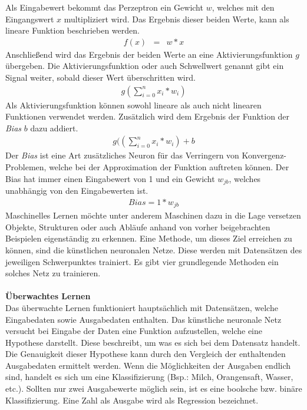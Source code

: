 Als Eingabewert bekommt das Perzeptron ein Gewicht $w$, welches mit den Eingangswert $x$ multipliziert wird. Das Ergebnis dieser beiden Werte, kann als lineare Funktion beschrieben werden.
\begin{eqnarray} f(x) & = & w*x \end{eqnarray}
Anschließend wird das Ergebnis der beiden Werte an eine Aktivierungsfunktion $g$ übergeben. Die Aktivierungsfunktion oder auch Schwellwert genannt gibt ein Signal weiter, sobald dieser Wert überschritten wird.
\begin{eqnarray} g( \sum_{i=0}^n x_{i} *w_{i}) \end{eqnarray}
Als Aktivierungsfunktion können sowohl lineare als auch nicht linearen Funktionen verwendet werden. Zusätzlich wird dem Ergebnis der Funktion der \textit{Bias} $b$ dazu addiert.
\begin{eqnarray} g(( \sum_{i=0}^n x_{i} *w_{i}) +b \end{eqnarray}
Der \textit{Bias} ist eine Art zusätzliches Neuron für das Verringern von Konvergenz-Problemen, welche bei der Approximation der Funktion auftreten können. Der Bias hat immer einen Eingabewert von 1 und ein Gewicht $w_{jb}$, welches unabhängig von den Eingabewerten ist.
\begin{eqnarray} Bias = 1*w_{jb} \end{eqnarray}
Maschinelles Lernen möchte unter anderem Maschinen dazu in die Lage versetzen Objekte, Strukturen oder auch Abläufe anhand von vorher beigebrachten Beispielen eigenständig zu erkennen. Eine Methode, um dieses Ziel erreichen zu können, sind die künstlichen neuronalen Netze. Diese werden mit Datensätzen des jeweiligen Schwerpunktes trainiert. Es gibt vier grundlegende Methoden ein solches Netz zu trainieren.\\\\
\textbf{Überwachtes Lernen}\\
Das überwachte Lernen funktioniert hauptsächlich mit Datensätzen, welche Eingabedaten sowie Ausgabedaten enthalten. Das künstliche neuronale Netz versucht bei Eingabe der Daten eine Funktion aufzustellen, welche eine Hypothese darstellt. Diese beschreibt, um was es sich bei dem Datensatz handelt. Die Genauigkeit dieser Hypothese kann durch den Vergleich der enthaltenden Ausgabedaten ermittelt werden. Wenn die Möglichkeiten der Ausgaben endlich sind, handelt es sich um eine Klassifizierung (Bsp.: Milch, Orangensaft, Wasser, etc.). Sollten nur zwei Ausgabewerte möglich sein, ist es eine boolsche bzw. binäre Klassifizierung. Eine Zahl als Ausgabe wird als Regression bezeichnet.\\\\
